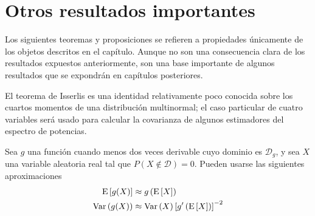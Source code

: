 \section{Otros resultados importantes}

Los siguientes teoremas y proposiciones se refieren a propiedades únicamente de los objetos descritos en el capítulo.
%
Aunque no son una consecuencia clara de los resultados expuestos anteriormente, son una base importante de algunos resultados que se expondrán en capítulos posteriores.

El teorema de Isserlis es una identidad relativamente poco conocida sobre los cuartos momentos de una distribución multinormal; el caso particular de cuatro variables será usado para calcular la covarianza de algunos estimadores del espectro de potencias.

\begin{proposicion}
Sea $g$ una función cuando menos dos veces derivable cuyo dominio es $\mathcal{D}_g$, y sea $X$ una variable aleatoria real tal que $P(X\notin \mathcal{D}) = 0$. 
Pueden usarse las siguientes aproximaciones
\begin{align}
\mathrm{E}\left[ g(X) \right] &\approx g\left( \mathrm{E}\left[ X \right] \right) \\
\mathrm{Var}\left( g(X) \right) &\approx \mathrm{Var}\left( X \right) \left[ g^{\prime} \left( \mathrm{E}\left[ X \right] \right) \right]^{-2}
\end{align}
\end{proposicion}


